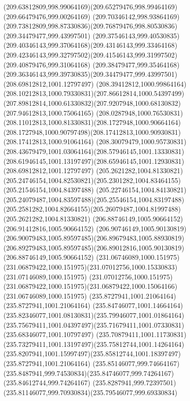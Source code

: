 {{		\curveto(209.63812809,998.99064169)(209.65279476,998.99464169)(209.66479476,999.00264169)
		\curveto(209.70346142,998.93864169)(209.73812809,998.87330836)(209.76879476,998.80530836)
		\moveto(209.34479477,999.43997501)
		\curveto(209.37546143,999.40530835)(209.40346143,999.37064168)(209.43146143,999.33464168)
		\curveto(209.42346143,999.32797502)(209.41546143,999.31997502)(209.40879476,999.31064168)
		\curveto(209.38479477,999.35464168)(209.36346143,999.39730835)(209.34479477,999.43997501)
		\moveto(208.69812812,1001.12797497)
		\curveto(208.39412812,1000.99864164)(208.10212813,1000.79330831)(207.86612814,1000.54397499)
		\curveto(207.89812814,1000.61330832)(207.9207948,1000.68130832)(207.94612813,1000.75064165)
		\curveto(208.0287948,1000.76530831)(208.11012813,1000.81330831)(208.1727948,1000.90664164)
		\curveto(208.1727948,1000.90797498)(208.17412813,1000.90930831)(208.17412813,1000.91064164)
		\curveto(208.30079479,1000.95730831)(208.43679479,1001.03064164)(208.57946145,1001.13330831)
		\curveto(208.61946145,1001.13197497)(208.65946145,1001.12930831)(208.69812812,1001.12797497)
		\moveto(205.2621282,1004.81330821)
		\curveto(205.24746154,1004.82530821)(205.2301282,1004.83464155)(205.21546154,1004.84397488)
		\curveto(205.22746154,1004.84130821)(205.24079487,1004.83597488)(205.25546154,1004.83197488)
		\curveto(205.2581282,1004.82664155)(205.26079487,1004.81997488)(205.2621282,1004.81330821)
		\moveto(206.88746149,1005.90664152)
		\lineto(206.91412816,1005.90664152)
		\curveto(206.90746149,1005.90130819)(206.90079483,1005.89597485)(206.89679483,1005.88930819)
		\curveto(206.89279483,1005.89597485)(206.89012816,1005.90130819)(206.88746149,1005.90664152)
		\moveto(231.06746089,1000.151975)
		\curveto(231.06879422,1000.151975)(231.07012756,1000.15330833)(231.07146089,1000.151975)
		\lineto(231.07012756,1000.151975)
		\curveto(231.06879422,1000.151975)(231.06879422,1000.15064166)(231.06746089,1000.151975)
		\moveto(235.8727941,1001.21064164)
		\lineto(235.8727941,1001.21064164)
		\curveto(235.84746077,1001.14664164)(235.82346077,1001.08130831)(235.79946077,1001.01864164)
		\curveto(235.75679411,1001.04397497)(235.71679411,1001.07330831)(235.68346077,1001.10797497)
		\curveto(235.70879411,1001.11730831)(235.73279411,1001.13197497)(235.75812744,1001.14264164)
		\curveto(235.8207941,1001.15997497)(235.85812744,1001.18397497)(235.8727941,1001.21064164)
		\moveto(235.85146077,999.74664167)
		\curveto(235.8487941,999.74530834)(235.84746077,999.74264167)(235.84612744,999.74264167)
		\curveto(235.8287941,999.72397501)(235.81146077,999.70930834)(235.79546077,999.69330834)
}}
